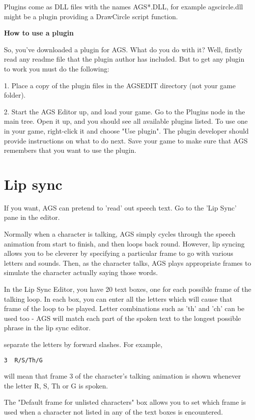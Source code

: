 Plugins come as DLL files with the names  AGS*.DLL, for example  agscircle.dll  might be a
plugin providing a DrawCircle script function.

\bf{How to use a plugin}

So, you've downloaded a plugin for AGS. What do you do with it?
Well, firstly read any readme file that the plugin author has included. But to get
any plugin to work you must do the following:

1. Place a copy of the plugin files in the AGSEDIT directory (not your game folder).

2. Start the AGS Editor up, and load your game. Go to the Plugins node in the main tree.
Open it up, and you should see all available plugins listed. To use one in your game,
right-click it and choose "Use plugin". The plugin developer should provide
instructions on what to do next. Save your game to make sure that AGS remembers
that you want to use the plugin.

\section{Lip sync}%

If you want, AGS can pretend to 'read' out speech text. Go to the 'Lip Sync' pane
in the editor.

Normally when a character is talking, AGS simply cycles through the speech animation
from start to finish, and then loops back round. However, lip syncing allows you to be
cleverer by specifying a particular frame to go with various letters and sounds. Then,
as the character talks, AGS plays appropriate frames to simulate the character actually
saying those words.

In the Lip Sync Editor, you have 20 text boxes, one for each possible frame of the
talking loop. In each box, you can enter all the letters which will cause that frame of
the loop to be played. Letter combinations such as 'th' and 'ch' can be used too - AGS
will match each part of the spoken text to the longest possible phrase in the lip sync
editor.

separate the letters by forward slashes. For example,

\begin{verbatim}
3  R/S/Th/G
\end{verbatim}

will mean that frame 3 of the character's talking animation is shown whenever the
letter R, S, Th or G is spoken.

The "Default frame for unlisted characters" box allows you to set which frame is used
when a character not listed in any of the text boxes is encountered.


